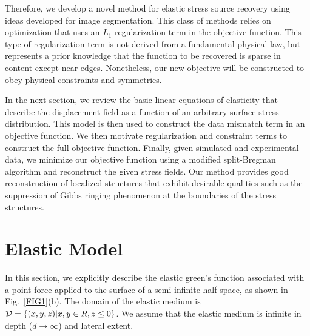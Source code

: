 \documentclass[aps,prl,reprint,twocolumn,groupedaddress,showpacs]{revtex4-1}
\begin{document}
Therefore, we develop a novel method for elastic stress source
recovery using ideas developed for image segmentation.  This class of
methods relies on optimization that uses an $L_{1}$ regularization
term in the objective function.  This type of regularization term is
not derived from a fundamental physical law, but represents a prior
knowledge that the function to be recovered is sparse in content
except near edges.  Nonetheless, our new objective will be constructed
to obey physical constraints and symmetries.

In the next section, we review the basic linear equations of
elasticity that describe the displacement field as a function of an
arbitrary surface stress distribution. This model is then used to
construct the data mismatch term in an objective function. We then
motivate regularization and constraint terms to construct the full
objective function. Finally, given simulated and experimental data, we
minimize our objective function using a modified split-Bregman
algorithm and reconstruct the given stress fields. Our method provides
good reconstruction of localized structures that exhibit desirable
qualities such as the suppression of Gibbs ringing phenomenon at the
boundaries of the stress structures.


\section{Elastic Model}

In this section, we explicitly describe the elastic green's function
associated with a point force applied to the surface of a
semi-infinite half-space, as shown in Fig.~\ref{FIG1}(b). The domain
of the elastic medium is ${\cal D}=\left\{(x,y,z)|x,y\in
R,z\leq0\right\}$. We assume that the elastic medium is infinite
in depth ($d\to \infty$) and lateral extent.
\end{document}
